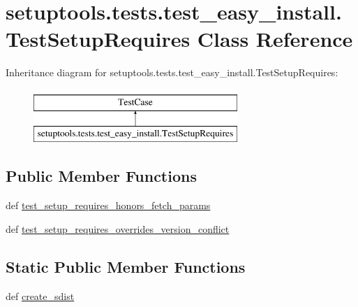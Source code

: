 \hypertarget{classsetuptools_1_1tests_1_1test__easy__install_1_1TestSetupRequires}{}\section{setuptools.\+tests.\+test\+\_\+easy\+\_\+install.\+Test\+Setup\+Requires Class Reference}
\label{classsetuptools_1_1tests_1_1test__easy__install_1_1TestSetupRequires}
Inheritance diagram for setuptools.\+tests.\+test\+\_\+easy\+\_\+install.\+Test\+Setup\+Requires\+:\begin{figure}[H]
\begin{center}
\leavevmode
\includegraphics[height=2.000000cm]{classsetuptools_1_1tests_1_1test__easy__install_1_1TestSetupRequires}
\end{center}
\end{figure}
\subsection*{Public Member Functions}
\begin{DoxyCompactItemize}
\item 
def \hyperlink{classsetuptools_1_1tests_1_1test__easy__install_1_1TestSetupRequires_ab884e392c50a6fdca9a88dfacb8cacc6}{test\+\_\+setup\+\_\+requires\+\_\+honors\+\_\+fetch\+\_\+params}
\item 
def \hyperlink{classsetuptools_1_1tests_1_1test__easy__install_1_1TestSetupRequires_a63b8a59da87770d3a00d529459247d70}{test\+\_\+setup\+\_\+requires\+\_\+overrides\+\_\+version\+\_\+conflict}
\end{DoxyCompactItemize}
\subsection*{Static Public Member Functions}
\begin{DoxyCompactItemize}
\item 
def \hyperlink{classsetuptools_1_1tests_1_1test__easy__install_1_1TestSetupRequires_ab9d582920b567024d46ed6ddc8639b65}{create\+\_\+sdist}
\end{DoxyCompactItemize}


